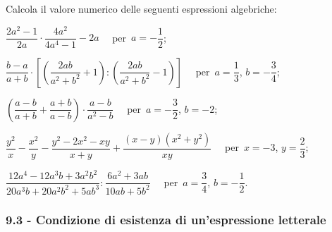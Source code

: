 \begin{esercizio}[\Ast]
\label{ese:9.23} %
Calcola il valore numerico delle seguenti espressioni algebriche:
 \begin{enumeratea}
\spazielenx
 \item $\dfrac{2a^2-1}{2a}\cdot \dfrac{4a^2}{4a^4-1}-2a\quad$ per~$a=-{\dfrac{1}{2}}$;
 \item $\dfrac{b-a}{a+b}\cdot\left[\left(\dfrac{2ab}{a^2+b^2}+1\right):\left(\dfrac{2ab}{a^2+b^2}-1\right)\right]\quad$ per~$a=\dfrac{1}{3}$, $b=-\dfrac{3}{4}$;
 \item $\left(\dfrac{a-b}{a+b}+\dfrac{a+b}{a-b}\right)\cdot\dfrac{a-b}{a^2-b}\quad$ per~$a=-\dfrac{3}{2}$, $b=-2$;
 \item $\dfrac{y^2}{x}-\dfrac{x^2}{y}-\dfrac{y^2-2x^2-xy}{x+y}+\dfrac{(x-y)(x^2+y^2)}{xy}\quad$ per~$x=-3$, $y=\dfrac{2}{3}$;
 \item $\dfrac{12a^4-12a^3b+3a^2b^2}{20a^3b+20a^2b^2+5ab^3}:\dfrac{6a^2+3ab}{10ab+5b^2}\quad$ per~$a=\dfrac{3}{4}$, $b=-\dfrac{1}{2}$.
 \end{enumeratea}
\end{esercizio}

\subsubsection*{9.3 - Condizione di esistenza di un'espressione letterale}

%
%

